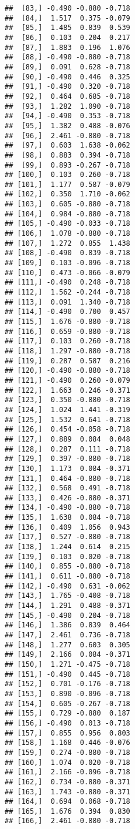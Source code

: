 \documentclass[
]{article}
\begin{document}
\begin{verbatim}
##  [83,] -0.490 -0.880 -0.718
##  [84,]  1.517  0.375 -0.079
##  [85,]  1.485  0.839  0.539
##  [86,]  0.103  0.204  0.217
##  [87,]  1.883  0.196  1.076
##  [88,] -0.490 -0.880 -0.718
##  [89,]  0.091  0.628 -0.718
##  [90,] -0.490  0.446  0.325
##  [91,] -0.490  0.320 -0.718
##  [92,]  0.464  0.685 -0.718
##  [93,]  1.282  1.090 -0.718
##  [94,] -0.490  0.353 -0.718
##  [95,]  1.382  0.488 -0.076
##  [96,]  2.461 -0.880 -0.718
##  [97,]  0.603  1.638 -0.062
##  [98,]  0.883  0.394 -0.718
##  [99,]  0.893 -0.267 -0.718
## [100,]  0.103  0.260 -0.718
## [101,]  1.177  0.587 -0.079
## [102,]  0.350  1.710 -0.062
## [103,]  0.605 -0.880 -0.718
## [104,]  0.984 -0.880 -0.718
## [105,] -0.490 -0.033 -0.718
## [106,]  1.078 -0.880 -0.718
## [107,]  1.272  0.855  1.438
## [108,] -0.490  0.839 -0.718
## [109,]  0.103 -0.096 -0.718
## [110,]  0.473 -0.066 -0.079
## [111,] -0.490  0.248 -0.718
## [112,]  1.562 -0.244 -0.718
## [113,]  0.091  1.340 -0.718
## [114,] -0.490  0.700  0.457
## [115,]  1.676 -0.880 -0.718
## [116,]  0.659 -0.880 -0.718
## [117,]  0.103  0.260 -0.718
## [118,]  1.297 -0.880 -0.718
## [119,]  0.287  0.587  0.216
## [120,] -0.490 -0.880 -0.718
## [121,] -0.490  0.260 -0.079
## [122,]  1.663  0.246 -0.371
## [123,]  0.350 -0.880 -0.718
## [124,]  1.024  1.441 -0.319
## [125,]  1.532  0.641 -0.718
## [126,]  0.454 -0.058 -0.718
## [127,]  0.889  0.084  0.048
## [128,]  0.287  0.111 -0.718
## [129,]  0.397 -0.880 -0.718
## [130,]  1.173  0.084 -0.371
## [131,]  0.464 -0.880 -0.718
## [132,]  0.568  0.491 -0.718
## [133,]  0.426 -0.880 -0.371
## [134,] -0.490 -0.880 -0.718
## [135,]  1.638  0.084 -0.718
## [136,]  0.409  1.056  0.943
## [137,]  0.527 -0.880 -0.718
## [138,]  1.244  0.614  0.215
## [139,]  0.103  0.020 -0.718
## [140,]  0.855 -0.880 -0.718
## [141,]  0.611 -0.880 -0.718
## [142,] -0.490  0.631 -0.062
## [143,]  1.765 -0.408 -0.718
## [144,]  1.291  0.488 -0.371
## [145,] -0.490  0.204 -0.718
## [146,]  1.386  0.839  0.464
## [147,]  2.461  0.736 -0.718
## [148,]  1.277  0.603  0.305
## [149,]  2.166  0.084 -0.371
## [150,]  1.271 -0.475 -0.718
## [151,] -0.490  0.445 -0.718
## [152,]  0.701 -0.176 -0.718
## [153,]  0.890 -0.096 -0.718
## [154,]  0.605 -0.267 -0.718
## [155,]  0.729 -0.880  0.187
## [156,] -0.490  0.013 -0.718
## [157,]  0.855  0.956  0.803
## [158,]  1.168  0.446 -0.076
## [159,]  0.274 -0.880 -0.718
## [160,]  1.074  0.020 -0.718
## [161,]  2.166 -0.096 -0.718
## [162,]  0.734 -0.880 -0.371
## [163,]  1.743 -0.880 -0.371
## [164,]  0.694  0.068 -0.718
## [165,]  1.676  0.394  0.830
## [166,]  2.461 -0.880 -0.718

\end{verbatim}
\end{document}
